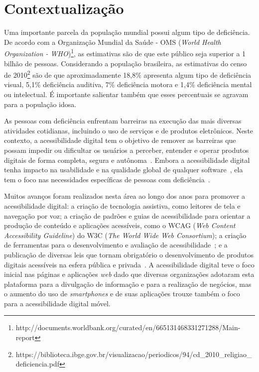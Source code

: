 

\section{Contextualização}

Uma importante parcela da população mundial possui algum tipo de deficiência. 
De acordo com a Organização Mundial da Saúde - OMS (\textit{World Health Organization - WHO})\footnote{http://documents.worldbank.org/curated/en/665131468331271288/Main-report}, 
as estimativas são de que este público seja superior a 1 bilhão de pessoas. Considerando a população brasileira, as estimativas do censo de 2010\footnote{https://biblioteca.ibge.gov.br/visualizacao/periodicos/94/cd\_2010\_religiao\_deficiencia.pdf} são de que aproximadamente 18,8\% apresenta algum tipo de deficiência visual, 5,1\% deficiência auditiva, 7\% deficiência motora e 1,4\% deficiência mental ou intelectual. É importante salientar também que esses percentuais se agravam para a população idosa.

As pessoas com deficiência enfrentam barreiras na execução das mais diversas atividades cotidianas, incluindo o uso de serviços e de produtos eletrônicos. 
Neste contexto, a acessibilidade digital tem o objetivo de remover as barreiras que possam impedir ou dificultar os usuários a perceber, entender e operar produtos digitais de forma completa, segura e autônoma~\cite{wcag,w3cwai}.
Embora a acessibilidade digital tenha impacto na usabilidade e na qualidade global de qualquer software~\cite{Gay2018,ISO25010}, ela tem o foco nas necessidades específicas de pessoas com deficiência~\cite{ISO9241:11}.


Muitos avanços foram realizados nesta área ao longo dos anos para promover a acessibilidade digital: a criação de tecnologia assistiva, como leitores de tela e navegação por voz; 
a criação de padrões e guias de acessibilidade para orientar a produção de conteúdo e aplicações acessíveis, como o WCAG (\textit{Web Content Accessibility Guideline}) do W3C (\textit{The World Wide Web Consortium});
a criação de ferramentas para o desenvolvimento e avaliação de acessibilidade~\cite{Silva2018survey};
e a publicação de diversas leis que tornam obrigatório o desenvolvimento de produtos digitais acessíveis na esfera pública e privada~\cite{Lazar2019}.
A acessibilidade digital teve o foco inicial nas páginas e aplicações \textit{web} dado que diversas organizações adotaram esta plataforma para a divulgação de informação e para a realização de negócios, mas o aumento do uso de \textit{smartphones} e de suas aplicações trouxe também o foco para a acessibilidade digital móvel.



